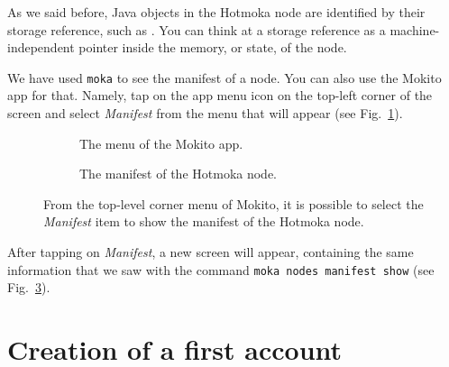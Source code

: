 As we said before, Java objects in the Hotmoka node are identified by their
storage reference, such as \texttt{\gasStation}.
You can think at a storage reference as a machine-independent pointer inside the
memory, or state, of the node.

We have used \texttt{moka} to see the manifest of a node. You can also use the
Mokito app for that. Namely, tap on the app menu icon on the top-left corner of the screen
and select \emph{Manifest} from the menu that will appear (see Fig.~\ref{fig:mokito_menu}).
%
\begin{figure}
\centering
\begin{subfigure}{.5\textwidth}
  \centering
  \caption{The menu of the Mokito app.}
  \label{fig:mokito_menu}
\end{subfigure}%
\begin{subfigure}{.5\textwidth}
  \centering
  \caption{The manifest of the Hotmoka node.}
  \label{fig:mokito_manifest}
\end{subfigure}
\caption{From the top-level corner menu of Mokito, it is possible to select the \emph{Manifest} item to show the manifest of the Hotmoka node.}
\end{figure}
%
After tapping on \emph{Manifest}, a new screen will appear, containing the same information
that we saw with the command \texttt{moka nodes manifest show} (see Fig.~\ref{fig:mokito_manifest}).

\section{Creation of a first account}\label{sec:creation_account}

